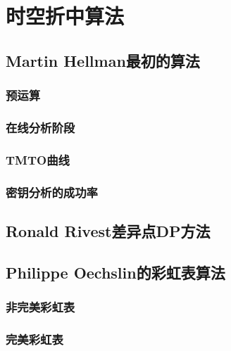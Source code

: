 \chapter{时空折中算法}
\section{Martin Hellman最初的算法}
	\subsection{预运算}
	\subsection{在线分析阶段}
	\subsection{TMTO曲线}
	\subsection{密钥分析的成功率}
\section{Ronald Rivest差异点DP方法}
\section{Philippe Oechslin的彩虹表算法}
	\subsection{非完美彩虹表}
	\subsection{完美彩虹表}


